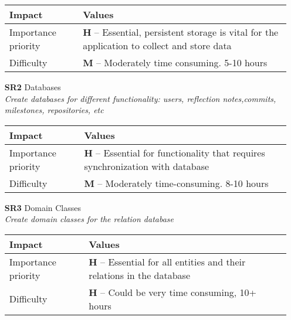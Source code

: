 \begin{itemize}
        \begin{tabular}{| l | p{7cm} |}
            \hline
            \rowcolor[gray]{0.8}
            \textbf{Impact} & \textbf{Values} \\
            \hline
            Importance priority & \textbf{H} -- Essential, persistent storage is vital for the application to collect and store data\\
            Difficulty & \textbf{M} -- Moderately time consuming. 5-10 hours\\
            \hline
        \end{tabular}
    \vspace{0.5cm}

    \item[\textbf{SR2}] Databases\\
        \textit{\small{Create databases for different functionality: users, reflection notes,commits, milestones, repositories, etc}}

        \begin{tabular}{| l | p{7cm} |}
            \hline
            \rowcolor[gray]{0.8}
            \textbf{Impact} & \textbf{Values} \\
            \hline
            Importance priority & \textbf{H} -- Essential for functionality that requires synchronization with database\\
            Difficulty & \textbf{M} -- Moderately time-consuming. 8-10 hours\\
            \hline
        \end{tabular}
    \vspace{0.5cm}

    \item[\textbf{SR3}] Domain Classes\\
        \textit{\small{Create domain classes for the relation database}}

        \begin{tabular}{| l | p{7cm} |}
            \hline
            \rowcolor[gray]{0.8}
            \textbf{Impact} & \textbf{Values} \\
            \hline
            Importance priority & \textbf{H} -- Essential for all entities and their relations in the database \\
            Difficulty & \textbf{H} -- Could be very time consuming, 10+ hours \\
            \hline
        \end{tabular}
    \vspace{0.5cm}
\end{itemize}

